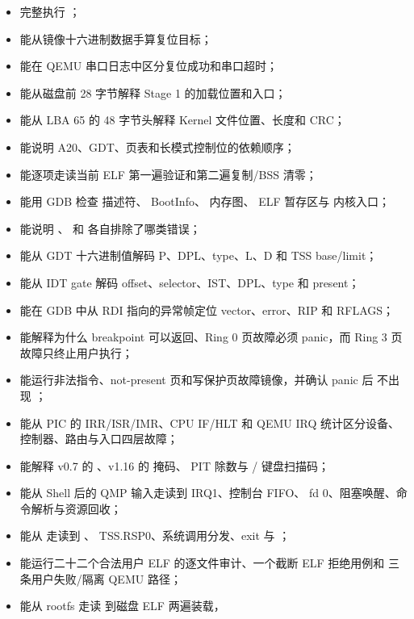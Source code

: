 \begin{itemize}
  \item 完整执行 ；
  \item 能从镜像十六进制数据手算复位目标；
  \item 能在 QEMU 串口日志中区分复位成功和串口超时；
  \item 能从磁盘前 28 字节解释 Stage 1 的加载位置和入口；
  \item 能从 LBA 65 的 48 字节头解释 Kernel 文件位置、长度和 CRC；
  \item 能说明 A20、GDT、页表和长模式控制位的依赖顺序；
  \item 能逐项走读当前 ELF 第一遍验证和第二遍复制/BSS 清零；
  \item 能用 GDB 检查  描述符、 BootInfo、
   内存图、 ELF 暂存区与
   内核入口；
  \item 能说明 、 和
   各自排除了哪类错误；
  \item 能从 GDT 十六进制值解码 P、DPL、type、L、D 和 TSS base/limit；
  \item 能从 IDT gate 解码 offset、selector、IST、DPL、type 和 present；
  \item 能在 GDB 中从 RDI 指向的异常帧定位 vector、error、RIP 和 RFLAGS；
  \item 能解释为什么 breakpoint 可以返回、Ring 0 页故障必须 panic，而
        Ring 3 页故障只终止用户执行；
  \item 能运行非法指令、not-present 页和写保护页故障镜像，并确认 panic 后
        不出现 ；
  \item 能从 PIC 的 IRR/ISR/IMR、CPU IF/HLT 和 QEMU IRQ 统计区分设备、
        控制器、路由与入口四层故障；
  \item 能解释 v0.7 的 、v1.16 的  掩码、
         PIT 除数与 / 键盘扫描码；
  \item 能从 Shell  后的 QMP 输入走读到 IRQ1、控制台 FIFO、
        fd 0、阻塞唤醒、命令解析与资源回收；
  \item 能从  走读到 、
        TSS.RSP0、系统调用分发、exit 与 ；
  \item 能运行二十二个合法用户 ELF 的逐文件审计、一个截断 ELF 拒绝用例和
        三条用户失败/隔离 QEMU 路径；
  \item 能从 rootfs 走读  到磁盘 ELF 两遍装载，

\end{itemize}
